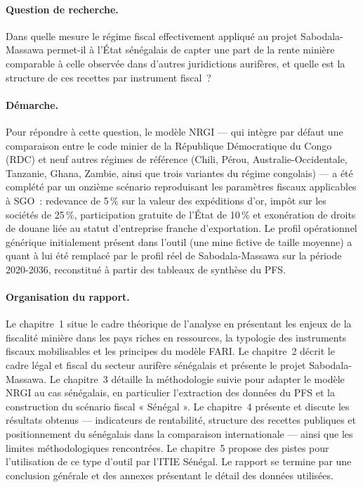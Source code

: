 \paragraph{Question de recherche.} Dans quelle mesure le régime fiscal effectivement appliqué au projet Sabodala-Massawa permet-il à l'État sénégalais de capter une part de la rente minière comparable à celle observée dans d'autres juridictions aurifères, et quelle est la structure de ces recettes par instrument fiscal~?

\paragraph{Démarche.} Pour répondre à cette question, le modèle NRGI --- qui intègre par défaut une comparaison entre le code minier de la République Démocratique du Congo (RDC) et neuf autres régimes de référence (Chili, Pérou, Australie-Occidentale, Tanzanie, Ghana, Zambie, ainsi que trois variantes du régime congolais) --- a été complété par un onzième scénario reproduisant les paramètres fiscaux applicables à SGO~: redevance de 5\,\% sur la valeur des expéditions d'or, impôt sur les sociétés de 25\,\%, participation gratuite de l'État de 10\,\% et exonération de droits de douane liée au statut d'entreprise franche d'exportation. Le profil opérationnel générique initialement présent dans l'outil (une mine fictive de taille moyenne) a quant à lui été remplacé par le profil réel de Sabodala-Massawa sur la période 2020-2036, reconstitué à partir des tableaux de synthèse du PFS.

\paragraph{Organisation du rapport.} Le chapitre~1 situe le cadre théorique de l'analyse en présentant les enjeux de la fiscalité minière dans les pays riches en ressources, la typologie des instruments fiscaux mobilisables et les principes du modèle FARI. Le chapitre~2 décrit le cadre légal et fiscal du secteur aurifère sénégalais et présente le projet Sabodala-Massawa. Le chapitre~3 détaille la méthodologie suivie pour adapter le modèle NRGI au cas sénégalais, en particulier l'extraction des données du PFS et la construction du scénario fiscal « Sénégal ». Le chapitre~4 présente et discute les résultats obtenus --- indicateurs de rentabilité, structure des recettes publiques et positionnement du \TEMI sénégalais dans la comparaison internationale --- ainsi que les limites méthodologiques rencontrées. Le chapitre~5 propose des pistes pour l'utilisation de ce type d'outil par l'ITIE Sénégal. Le rapport se termine par une conclusion générale et des annexes présentant le détail des données utilisées.
